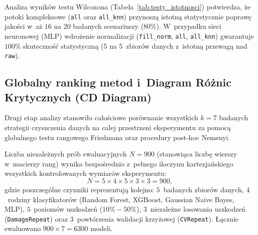 Analiza wyników testu Wilcoxona (Tabela~\ref{tab:testy_istotnosci}) potwierdza, że potoki kompleksowe (\texttt{all} oraz \texttt{all\_knn}) przynoszą istotną statystycznie poprawę jakości w~aż $16$ na $20$ badanych scenariuszy ($80\%$). W~przypadku sieci neuronowej (MLP) wdrożenie normalizacji (\texttt{fill\_norm}, \texttt{all}, \texttt{all\_knn}) gwarantuje $100\%$ skuteczność statystyczną (5 na 5~zbiorów danych z~istotną przewagą nad \texttt{raw}).

\subsection{Globalny ranking metod i~Diagram Różnic Krytycznych (CD Diagram)}
Drugi etap analizy stanowiło całościowe porównanie wszystkich $k=7$ badanych strategii czyszczenia danych na całej przestrzeni eksperymentu za pomocą globalnego testu rangowego Friedmana oraz procedury post-hoc Nemenyi.

Liczba niezależnych prób ewaluacyjnych $N=900$ (stanowiąca liczbę wierszy w~macierzy rang) wynika bezpośrednio z~pełnego iloczynu kartezjańskiego wszystkich kontrolowanych wymiarów eksperymentu:
\begin{equation}
N = 5 \times 4 \times 5 \times 3 \times 3 = 900,
\label{eq:liczba_prob_n}
\end{equation}
gdzie poszczególne czynniki reprezentują kolejno: $5$~badanych zbiorów danych, $4$~rodziny klasyfikatorów (Random Forest, XGBoost, Gaussian Naive Bayes, MLP), $5$~poziomów uszkodzeń ($10\% - 50\%$), $3$~niezależne losowania uszkodzeń (\texttt{DamageRepeat}) oraz $3$~powtórzenia walidacji krzyżowej (\texttt{CVRepeat}). Łącznie ewaluowano $900 \times 7 = 6300$ modeli.


